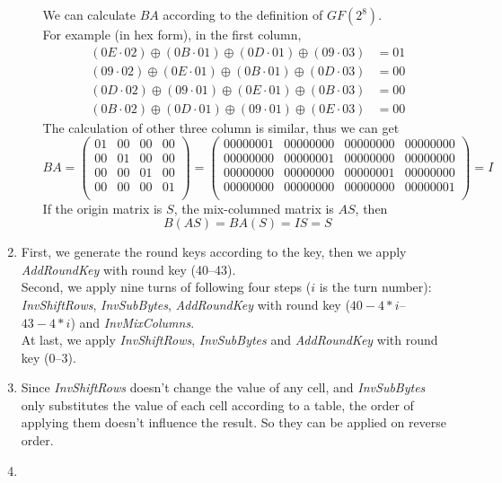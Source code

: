 \documentclass{article}
\begin{document}
\begin{enumerate}
\begin{enumerate}[(a)]
We can calculate $BA$ according to the definition of $GF(2^8)$.\\
For example (in hex form), in the first column, 
\begin{align*}
(0E\cdot02)\oplus(0B\cdot01)\oplus(0D\cdot01)\oplus(09\cdot03)&=01\\
(09\cdot02)\oplus(0E\cdot01)\oplus(0B\cdot01)\oplus(0D\cdot03)&=00\\
(0D\cdot02)\oplus(09\cdot01)\oplus(0E\cdot01)\oplus(0B\cdot03)&=00\\
(0B\cdot02)\oplus(0D\cdot01)\oplus(09\cdot01)\oplus(0E\cdot03)&=00
\end{align*}
The calculation of other three column is similar, thus we can get
$$BA=\begin{pmatrix}
01 & 00 & 00 & 00 \\
00 & 01 & 00 & 00 \\
00 & 00 & 01 & 00 \\
00 & 00 & 00 & 01 \\
\end{pmatrix}=\begin{pmatrix}
00000001 & 00000000 & 00000000 & 00000000 \\
00000000 & 00000001 & 00000000 & 00000000 \\
00000000 & 00000000 & 00000001 & 00000000 \\
00000000 & 00000000 & 00000000 & 00000001 \\
\end{pmatrix}=I$$
If the origin matrix is $S$, the mix-columned matrix is $AS$, then $$B(AS)=BA(S)=IS=S$$
\end{enumerate}
\item
First, we generate the round keys according to the key, then we apply \emph{AddRoundKey} with round key (40--43).\\[1mm]
Second, we apply nine turns of following four steps ($i$ is the turn number): \emph{InvShiftRows}, \emph{InvSubBytes}, \emph{AddRoundKey} with round key ($40-4*i$--$43-4*i$) and \emph{InvMixColumns}.\\[1mm]
At last, we apply \emph{InvShiftRows}, \emph{InvSubBytes} and \emph{AddRoundKey} with round key (0--3).
\item
Since \emph{InvShiftRows} doesn't change the value of any cell, and \emph{InvSubBytes} only substitutes the value of each cell according to a table, the order of applying them doesn't influence the result. So they can be applied on reverse order.
\item
\begin{enumerate}[(a)]

\end{enumerate}
\end{enumerate}
\end{document}
